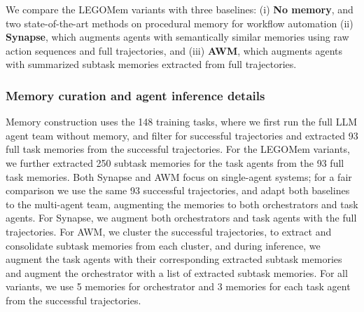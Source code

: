 \documentclass[sigconf]{aamas}
\newcommand{\legomem}{LEGOMem}
\begin{document}
We compare the \legomem{} variants with three baselines: (i) \textbf{No memory}, and two state-of-the-art methods on procedural memory for workflow automation (ii) \textbf{Synapse}, which augments agents with semantically similar memories using raw action sequences and full trajectories, and (iii) \textbf{AWM}, which augments agents with summarized subtask memories extracted from full trajectories. 

\subsubsection{Memory curation and agent inference details}
Memory construction uses the 148 training tasks, where we first run the full LLM agent team without memory, and filter for successful trajectories and extracted 93 full task memories from the successful trajectories. For the \legomem{} variants, we further extracted 250 subtask memories for the task agents from the 93 full task memories. 
Both Synapse and AWM focus on single-agent systems; for a fair comparison we use the same 93 successful trajectories, and adapt both baselines to the multi-agent team, augmenting the memories to both orchestrators and task agents. For Synapse, we augment both orchestrators and task agents with the full trajectories. For AWM, we cluster the successful trajectories, to extract and consolidate subtask memories from each cluster, and during inference, we augment the task agents with their corresponding extracted subtask memories and augment the orchestrator with a list of extracted subtask memories. 
For all variants, we use 5 memories for orchestrator and 3 memories for each task agent from the successful trajectories.
\end{document}
